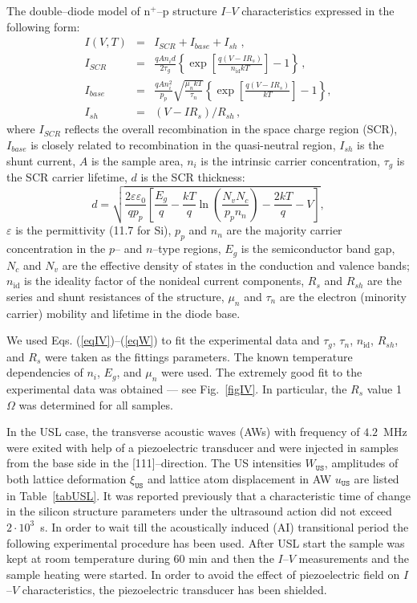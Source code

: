 \documentclass[aip,jap, amsmath,amssymb,reprint]{revtex4-1}
\begin{document}
The double--diode model of n$^+$--p structure $I$--$V$ characteristics expressed in the following form:
\begin{eqnarray}
I(V,T)&=&I_{SCR}+I_{base}+I_{sh}\;,\label{eqIV}\\
I_{SCR}&=&\frac{qAn_id}{2\tau_{g}}\left\{\exp \left[\frac{q(V-IR_s)}{n_{\mathrm{id}}kT}\right]-1\right\}\,,\label{eqIscr}\\
I_{base}&=&\frac{qAn_i^2}{p_p}\sqrt{\frac{\mu_nkT}{\tau_n}}\left\{\exp \left[\frac{q(V-IR_s)}{kT}\right]-1\right\},\label{eqIbase}\\
I_{sh}&=&(V-IR_s)/R_{sh}\,,\label{eqIsh}
\end{eqnarray}
where
$I_{SCR}$ reflects the overall recombination in the space charge region (SCR),
$I_{base}$ is closely related to recombination in the quasi-neutral region,
$I_{sh}$ is the shunt current,
$A$ is the sample area,
$n_i$ is the intrinsic carrier concentration,
$\tau_{g}$ is the SCR carrier lifetime,
$d$ is the  SCR thickness:
\begin{equation}
\label{eqW}
    d=\sqrt{\frac{2 \varepsilon \varepsilon_0}{q p_p}\left[
     \frac{E_g}{q}-\frac{kT}{q}\ln\!\left(\frac{N_vN_c}{p_pn_n}\right)-\frac{2kT}{q}-V\right]},
\end{equation}
$\varepsilon$ is the permittivity (11.7 for Si),
$p_p$ and $n_n$ are the majority carrier concentration in the $p$-- and $n$--type regions,
$E_g$ is the semiconductor band gap,
$N_c$ and $N_v$ are the effective density of states in the conduction and valence bands;
$n_{\mathrm{id}}$ is the ideality factor of the nonideal current components,
$R_s$ and $R_{sh}$ are the series and shunt resistances of the structure,
$\mu_n$ and $\tau_n$ are the electron (minority carrier) mobility and lifetime in the diode base.


We used Eqs. (\ref{eqIV})--(\ref{eqW}) to fit the experimental data and $\tau_g$, $\tau_n$, $n_{\mathrm{id}}$, $R_{sh}$, and $R_s$ were taken as the  fittings parameters.
The known \cite{ni:Green,Schroder2006,Markvart} temperature dependencies of $n_i$, $E_g$, and $\mu_n$ were used.
The extremely good fit to the experimental data was obtained --- see Fig.~\ref{figIV}.
In particular, the $R_s$ value 1~$\Omega$ was determined for all samples.


In the USL case, the transverse acoustic waves (AWs) with frequency of $4.2$~MHz were exited with help of a piezoelectric transducer and were injected in samples from the base side in the [111]--direction.
The US intensities $W_{\mathtt{US}}$, amplitudes of both lattice deformation $\xi_{\mathtt{US}}$ and lattice atom
displacement  in AW $u_{\mathtt{US}}$ are listed in Table~\ref{tabUSL}.
It was reported previously \cite{Ostapenko1995,Olikh:Ultras,Ostrovskii2001} that a characteristic time of change in the silicon structure parameters under the ultrasound action  did not exceed $2\cdot10^3$~s.
In order to wait till the acoustically induced (AI) transitional period the following experimental procedure has been used.
After USL start the sample was kept at room temperature during 60 min and then the $I$--$V$ measurements and the sample heating were started.
In order to avoid the effect of piezoelectric field on $I$--$V$ characteristics, the piezoelectric transducer has been shielded.
\end{document}
